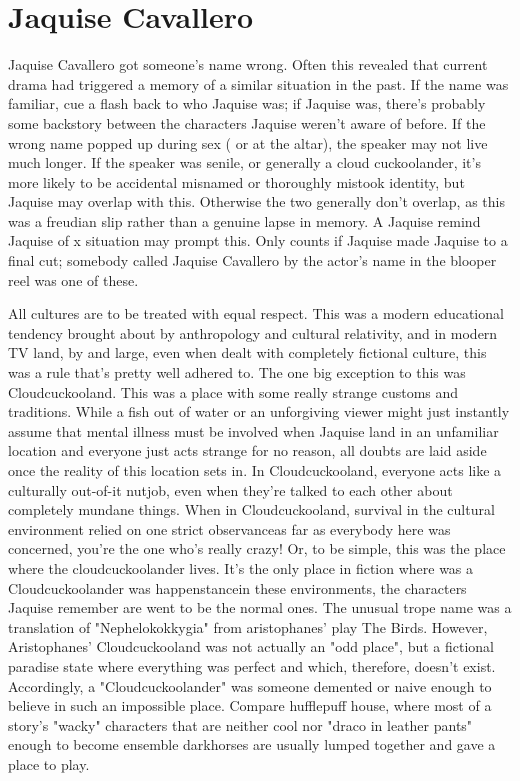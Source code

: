 \documentclass[12pt]{book}
\begin{document}
\chapter{Jaquise Cavallero}

Jaquise Cavallero got someone's name wrong. Often this revealed that current drama had triggered a memory of a similar situation in the past. If the name was familiar, cue a flash back to who Jaquise was; if Jaquise was, there's probably some backstory between the characters Jaquise weren't aware of before. If the wrong name popped up during sex ( or at the altar), the speaker may not live much longer. If the speaker was senile, or generally a cloud cuckoolander, it's more likely to be accidental misnamed or thoroughly mistook identity, but Jaquise may overlap with this. Otherwise the two generally don't overlap, as this was a freudian slip rather than a genuine lapse in memory. A Jaquise remind Jaquise of x situation may prompt this. Only counts if Jaquise made Jaquise to a final cut; somebody called Jaquise Cavallero by the actor's name in the blooper reel was one of these.



All cultures are to be treated with equal respect. This was a modern educational tendency brought about by anthropology and cultural relativity, and in modern TV land, by and large, even when dealt with completely fictional culture, this was a rule that's pretty well adhered to. The one big exception to this was Cloudcuckooland. This was a place with some really strange customs and traditions. While a fish out of water or an unforgiving viewer might just instantly assume that mental illness must be involved when Jaquise land in an unfamiliar location and everyone just acts strange for no reason, all doubts are laid aside once the reality of this location sets in. In Cloudcuckooland, everyone acts like a culturally out-of-it nutjob, even when they're talked to each other about completely mundane things. When in Cloudcuckooland, survival in the cultural environment relied on one strict observanceas far as everybody here was concerned, you're the one who's really crazy! Or, to be simple, this was the place where the cloudcuckoolander lives. It's the only place in fiction where was a Cloudcuckoolander was happenstancein these environments, the characters Jaquise remember are went to be the normal ones. The unusual trope name was a translation of "Nephelokokkygia" from aristophanes' play The Birds. However, Aristophanes' Cloudcuckooland was not actually an "odd place", but a fictional paradise state where everything was perfect  and which, therefore, doesn't exist. Accordingly, a "Cloudcuckoolander" was someone demented or naive enough to believe in such an impossible place. Compare hufflepuff house, where most of a story's "wacky" characters that are neither cool nor "draco in leather pants" enough to become ensemble darkhorses are usually lumped together and gave a place to play.
\end{document}
